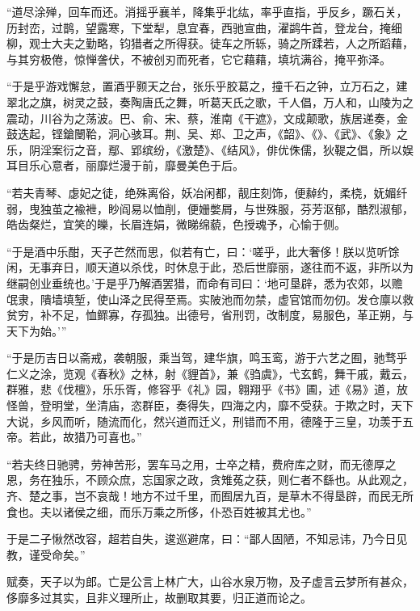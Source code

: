 \documentclass[12pt,UTF8]{ctexbook}
\begin{document}
“道尽涂殚，回车而还。消摇乎襄羊，降集乎北纮，率乎直指，乎反乡，蹶石关，历封峦，过鹊，望露寒，下堂犁，息宜春，西驰宣曲，濯鹢牛首，登龙台，掩细柳，观士大夫之勤略，钧猎者之所得获。徒车之所轹，骑之所蹂若，人之所蹈藉，与其穷极倦，惊惮詟伏，不被创刃而死者，它它藉藉，填坑满谷，掩平弥泽。



“于是乎游戏懈怠，置酒乎颢天之台，张乐乎胶葛之，撞千石之钟，立万石之，建翠北之旗，树灵之鼓，奏陶唐氏之舞，听葛天氏之歌，千人倡，万人和，山陵为之震动，川谷为之荡波。巴、俞、宋、蔡，淮南《干遮》，文成颠歌，族居递奏，金鼓迭起，铿鎗闛鞈，洞心骇耳。荆、吴、郑、卫之声，《韶》、《》、《武》、《象》之乐，阴淫案衍之音，鄢、郢缤纷，《激楚》、《结风》，俳优侏儒，狄鞮之倡，所以娱耳目乐心意者，丽靡烂漫于前，靡曼美色于后。



“若夫青琴、虙妃之徒，绝殊离俗，妖冶闲都，靓庄刻饰，便繛约，柔桡，妩媚纤弱，曳独茧之褕袣，眇阎易以恤削，便姗嫳屑，与世殊服，芬芳沤郁，酷烈淑郁，皓齿粲烂，宜笑的皪，长眉连娟，微睇绵藐，色授魂予，心愉于侧。



“于是酒中乐酣，天子芒然而思，似若有亡，曰：‘嗟乎，此大奢侈！朕以览听馀闲，无事弃日，顺天道以杀伐，时休息于此，恐后世靡丽，遂往而不返，非所以为继嗣创业垂统也。’于是乎乃解酒罢猎，而命有司曰：‘地可垦辟，悉为农郊，以赡氓隶，隤墙填堑，使山泽之民得至焉。实陂池而勿禁，虚官馆而勿仞。发仓廪以救贫穷，补不足，恤鳏寡，存孤独。出德号，省刑罚，改制度，易服色，革正朔，与天下为始。’”



“于是历吉日以斋戒，袭朝服，乘当驾，建华旗，鸣玉鸾，游于六艺之囿，驰骛乎仁义之涂，览观《春秋》之林，射《貍首》，兼《驺虞》，弋玄鹤，舞干戚，戴云，群雅，悲《伐檀》，乐乐胥，修容乎《礼》园，翱翔乎《书》圃，述《易》道，放怪兽，登明堂，坐清庙，恣群臣，奏得失，四海之内，靡不受获。于欺之时，天下大说，乡风而听，随流而化，然兴道而迁义，刑错而不用，德隆于三皇，功羡于五帝。若此，故猎乃可喜也。”



“若夫终日驰骋，劳神苦形，罢车马之用，士卒之精，费府库之财，而无德厚之恩，务在独乐，不顾众庶，忘国家之政，贪雉菟之获，则仁者不繇也。从此观之，齐、楚之事，岂不哀哉！地方不过千里，而囿居九百，是草木不得垦辟，而民无所食也。夫以诸侯之细，而乐万乘之所侈，仆恐百姓被其尤也。”



于是二子愀然改容，超若自失，逡巡避席，曰：“鄙人固陋，不知忌讳，乃今日见教，谨受命矣。”



赋奏，天子以为郎。亡是公言上林广大，山谷水泉万物，及子虚言云梦所有甚众，侈靡多过其实，且非义理所止，故删取其要，归正道而论之。
\end{document}
